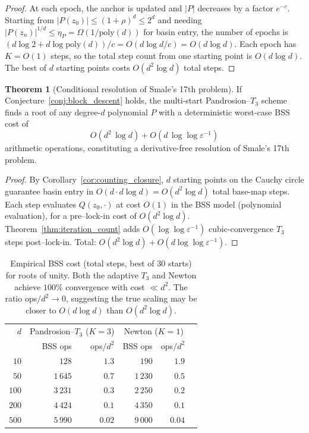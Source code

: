 \documentclass[11pt,a4paper]{article}
\theoremstyle{definition}
\newtheorem{theorem}{Theorem}[section]
\begin{document}
\begin{proof}
At each epoch, the anchor is updated and $|P|$ decreases by a factor $e^{-c}$.  Starting from $|P(z_0)| \leq (1+\rho)^d \leq 2^d$ and needing $|P(z_n)|^{1/d} \leq \eta_P = \Omega(1/\mathrm{poly}(d))$ for basin entry, the number of epochs is $(d\log 2 + d\log\mathrm{poly}(d))/c = O(d\log d/c) = O(d\log d)$.  Each epoch has $K = O(1)$ steps, so the total step count from one starting point is $O(d\log d)$.  The best of $d$ starting points costs $O(d^2\log d)$ total steps.
\end{proof}

\begin{theorem}[Conditional resolution of Smale's 17th problem]
\label{thm:smale_conditional}
If Conjecture~\ref{conj:block_descent} holds, the multi-start Pandrosion--$T_3$ scheme finds a root of any degree-$d$ polynomial $P$ with a deterministic worst-case BSS cost of
\begin{equation}
  \label{eq:smale_cost}
  O(d^2\,\log d) + O(d\,\log\!\log\varepsilon^{-1})
\end{equation}
arithmetic operations, constituting a derivative-free resolution of Smale's 17th problem.
\end{theorem}

\begin{proof}
By Corollary~\ref{cor:counting_closure}, $d$ starting points on the Cauchy circle guarantee basin entry in $O(d \cdot d\log d) = O(d^2\log d)$ total base-map steps.  Each step evaluates $Q(z_0,\cdot)$ at cost $O(1)$ in the BSS model (polynomial evaluation), for a pre--lock-in cost of $O(d^2\log d)$.  Theorem~\ref{thm:iteration_count} adds $O(\log\!\log\varepsilon^{-1})$ cubic-convergence $T_3$ steps post--lock-in.  Total: $O(d^2\log d) + O(d\log\!\log\varepsilon^{-1})$.
\end{proof}

\begin{table}[H]
\centering
\renewcommand{\arraystretch}{1.2}
\begin{tabular}{rrrrrr}
\toprule
$d$ & \multicolumn{2}{c}{Pandrosion--$T_3$ ($K\!=\!3$)} & \multicolumn{2}{c}{Newton ($K\!=\!1$)} \\
    & BSS ops & ops$/d^2$ & BSS ops & ops$/d^2$ \\
\midrule
$10$   & $128$      & $1.3$ & $190$  & $1.9$ \\
$50$   & $1\,645$   & $0.7$ & $1\,230$ & $0.5$ \\
$100$  & $3\,231$   & $0.3$ & $2\,250$ & $0.2$ \\
$200$  & $4\,424$   & $0.1$ & $4\,350$ & $0.1$ \\
$500$  & $5\,990$   & $0.02$ & $9\,000$ & $0.04$ \\
\bottomrule
\end{tabular}
\caption{Empirical BSS cost (total steps, best of $30$ starts) for roots of unity.  Both the adaptive $T_3$ and Newton achieve $100\%$ convergence with cost $\ll d^2$.  The ratio ops$/d^2 \to 0$, suggesting the true scaling may be closer to $O(d\log d)$ than $O(d^2\log d)$.}
\label{tab:bss_scaling}
\end{table}
\end{document}
